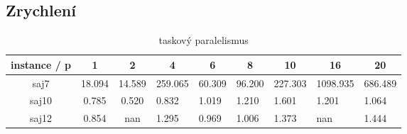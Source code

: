 \documentclass{article}
\begin{document}
    \subsection{Zrychlení}

    \begin{table}[h]
        \begin{subtable}{.5\linewidth}\centering
        \begin{tabular}{|c|c|c|l|l|l|l|l|l|}
            \hline
            \textbf{instance / p} &
            \textbf{1} &
            \textbf{2} &
            \multicolumn{1}{c|}{\textbf{4}} &
            \multicolumn{1}{c|}{\textbf{6}} &
            \multicolumn{1}{c|}{\textbf{8}} &
            \multicolumn{1}{c|}{\textbf{10}} &
            \multicolumn{1}{c|}{\textbf{16}} &
            \multicolumn{1}{c|}{\textbf{20}} \\ \hline
            saj7 &
                {\color[HTML]{FE0000} 18.094} &
                {\color[HTML]{FE0000} 14.589} &
                {\color[HTML]{FE0000} 259.065} &
                {\color[HTML]{FE0000} 60.309} &
                {\color[HTML]{FE0000} 96.200} &
                {\color[HTML]{FE0000} 227.303} &
                {\color[HTML]{FE0000} 1098.935} &
                {\color[HTML]{FE0000} 686.489} \\ \hline
            saj10 & 0.785 & 0.520 & 0.832 & 1.019 & 1.210 & 1.601 & 1.201 & 1.064 \\ \hline
            saj12 & 0.854 & nan   & 1.295 & 0.969 & 1.006 & 1.373 & nan   & 1.444 \\ \hline
        \end{tabular}
        \caption{taskový paralelismus} \label{tab:speedup-openmp-task}
        \end{subtable}%
        \bigskip
        \bigskip


\end{table}
\end{document}
